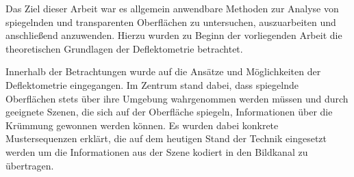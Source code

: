 Das Ziel dieser Arbeit war es allgemein anwendbare Methoden zur Analyse von spiegelnden und transparenten Oberflächen zu untersuchen, auszuarbeiten und anschließend anzuwenden.
Hierzu wurden zu Beginn der vorliegenden Arbeit die theoretischen Grundlagen der Deflektometrie betrachtet.

\p
Innerhalb der Betrachtungen wurde auf die Ansätze und Möglichkeiten der Deflektometrie eingegangen.
Im Zentrum stand dabei, dass spiegelnde Oberflächen stets über ihre Umgebung wahrgenommen werden müssen und durch geeignete Szenen, die sich auf der Oberfläche spiegeln, Informationen über die Krümmung gewonnen werden können.
Es wurden dabei konkrete Mustersequenzen erklärt, die auf dem heutigen Stand der Technik eingesetzt werden um die Informationen aus der Szene kodiert in den Bildkanal zu übertragen.

